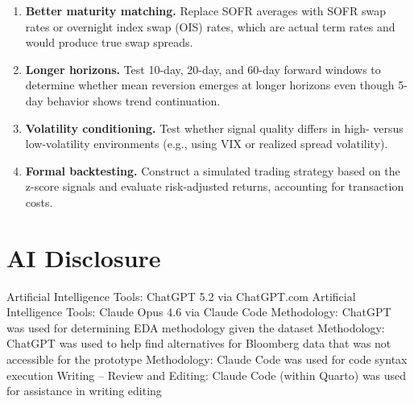 \documentclass[
  11pt,
  letterpaper,
  DIV=11,
  numbers=noendperiod]{scrartcl}
\providecommand{\tightlist}{%
  \setlength{\itemsep}{0pt}\setlength{\parskip}{0pt}}
\begin{document}
\begin{enumerate}
\def\labelenumi{\arabic{enumi}.}
\tightlist
\item
  \textbf{Better maturity matching.} Replace SOFR averages with SOFR
  swap rates or overnight index swap (OIS) rates, which are actual term
  rates and would produce true swap spreads.
\item
  \textbf{Longer horizons.} Test 10-day, 20-day, and 60-day forward
  windows to determine whether mean reversion emerges at longer horizons
  even though 5-day behavior shows trend continuation.
\item
  \textbf{Volatility conditioning.} Test whether signal quality differs
  in high- versus low-volatility environments (e.g., using VIX or
  realized spread volatility).
\item
  \textbf{Formal backtesting.} Construct a simulated trading strategy
  based on the z-score signals and evaluate risk-adjusted returns,
  accounting for transaction costs.
\end{enumerate}

\section{AI Disclosure}\label{ai-disclosure}

Artificial Intelligence Tools: ChatGPT 5.2 via ChatGPT.com Artificial
Intelligence Tools: Claude Opus 4.6 via Claude Code Methodology: ChatGPT
was used for determining EDA methodology given the dataset Methodology:
ChatGPT was used to help find alternatives for Bloomberg data that was
not accessible for the prototype Methodology: Claude Code was used for
code syntax execution Writing -- Review and Editing: Claude Code (within
Quarto) was used for assistance in writing editing
\end{document}
